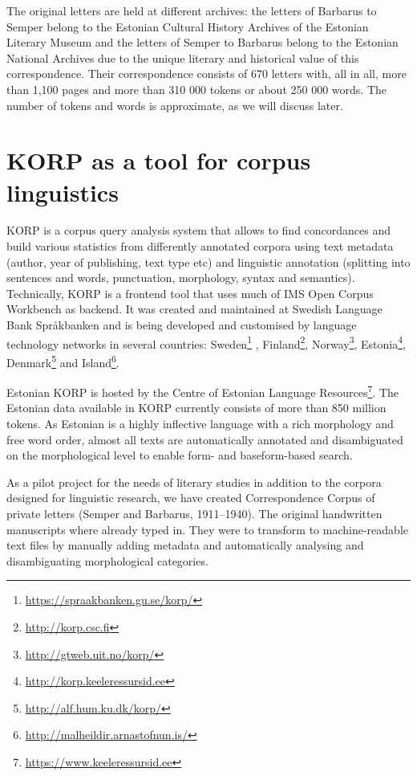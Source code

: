 \documentclass[runningheads]{llncs}
\begin{document}
The original letters are held at different archives: the letters of Barbarus to Semper belong to the Estonian Cultural History Archives of the Estonian Literary Museum and the letters of Semper to Barbarus belong to the Estonian National Archives due to the unique literary and historical value of this correspondence. Their correspondence consists of 670 letters with, all in all, more than 1,100 pages and more than 310 000 tokens or about 250 000 words.  The number of tokens and words is approximate, as we will discuss later. 


\section{KORP as a tool for corpus linguistics}

KORP is a corpus query analysis system that allows to find concordances and build various statistics from differently annotated corpora using text metadata (author, year of publishing, text type etc) and linguistic annotation (splitting into sentences and words, punctuation, morphology, syntax and semantics). Technically, KORP is a frontend tool that uses much of IMS Open Corpus Workbench \cite{Hardie:2012:1384-6655:380} as backend. It was created and maintained at Swedish Language Bank Spr{\aa}kbanken \cite{BORIN12.248} and is being developed and customised by language technology networks in several countries: Sweden\footnote{\url{https://spraakbanken.gu.se/korp/}}
, Finland\footnote{\url{http://korp.csc.fi}}, Norway\footnote{\url{http://gtweb.uit.no/korp/}}, Estonia\footnote{\url{http://korp.keeleressursid.ee}}, Denmark\footnote{\url{http://alf.hum.ku.dk/korp/}} and Island\footnote{\url{http://malheildir.arnastofnun.is/}}. 

Estonian KORP is hosted by the Centre of Estonian Language Resources\footnote{\url{https://www.keeleressursid.ee}}. The Estonian data available in KORP currently consists of more than 850 million tokens. As Estonian is a highly inflective language with a rich morphology and free word order, almost all texts are automatically annotated and disambiguated on the morphological level to enable form- and baseform-based search.


As a pilot project for the needs of literary studies in addition to the corpora designed for linguistic research, we have created Correspondence Corpus of private letters (Semper and Barbarus, 1911--1940). The original handwritten manuscripts where already typed in. They were to transform to machine-readable text files by manually adding metadata and automatically analysing and disambiguating morphological categories. 
\end{document}
